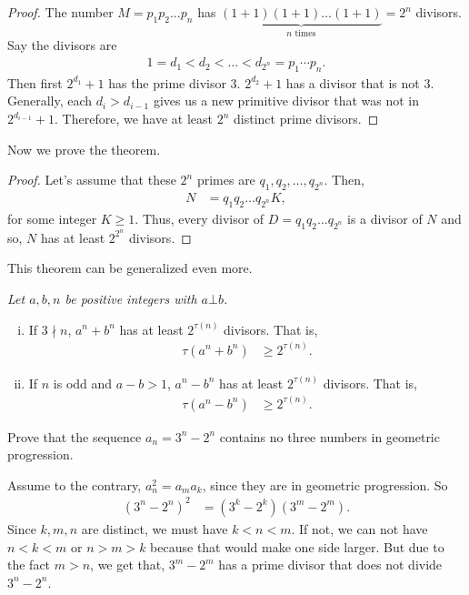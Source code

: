 \documentclass{subfile}
\begin{document}
		\begin{proof}
			The number $M=p_1p_2\dots p_n$ has $\underbrace{(1+1)(1+1)\dots(1+1)}_{n\text{ times}}=2^n$ divisors. Say the divisors are
				\begin{align*}
					1=d_1<d_2<\ldots<d_{2^n}=p_1\cdots p_n.
				\end{align*}
			Then first $2^{d_1}+1$ has the prime divisor $3$. $2^{d_2}+1$ has a divisor that is not $3$. Generally, each $d_i>d_{i-1}$ gives us a new primitive divisor that was not in $2^{d_{i-1}}+1$. Therefore, we have at least $2^n$ distinct prime divisors.
		\end{proof}
	Now we prove the theorem.
		\begin{proof}
			Let's assume that these $2^n$ primes are $q_1, q_2, \dots, q_{2^n}$. Then,
				\begin{align*}
					N & = q_1q_2\dots q_{2^n}K,
				\end{align*}
			for some integer $K\geq1$. Thus, every divisor of $D=q_1q_2\dots q_{2^n}$ is a divisor of $N$ and so, $N$ has at least $2^{2^n}$ divisors.
		\end{proof}
	This theorem can be generalized even more.
		\begin{theorem}\slshape
			Let $a,b,n$ be positive integers with $a\bot b$.
				\begin{enumerate}[i.]
					\item If $3\nmid n$, $a^n+b^n$ has at least $2^{\tau(n)}$ divisors. That is,
						\begin{align*}
							\tau(a^n+b^n) &\geq2^{\tau(n)}.
						\end{align*}
					\item If $n$ is odd and $a-b>1$, $a^n-b^n$ has at least $2^{\tau(n)}$ divisors. That is,
						\begin{align*}
							\tau(a^n-b^n) & \geq2^{\tau(n)}.
						\end{align*}
				\end{enumerate}
		\end{theorem}
		
		\begin{problem}
			Prove that the sequence $a_n = 3^n - 2^n$ contains no three numbers in geometric progression.
		\end{problem}
		
		\begin{solution}
			Assume to the contrary, $a_n^2=a_ma_k$, since they are in geometric progression. So
				\begin{align*}
					(3^n-2^n)^2 & = (3^k-2^k)(3^m-2^m).
				\end{align*}
			Since $k,m,n$ are distinct, we must have $k<n<m$. If not, we can not have $n<k<m$ or $n>m>k$ because that would make one side larger. But due to the fact $m>n$, we get that, $3^m-2^m$ has a prime divisor that does not divide $3^n-2^n$.
		\end{solution}
		
\end{document}
